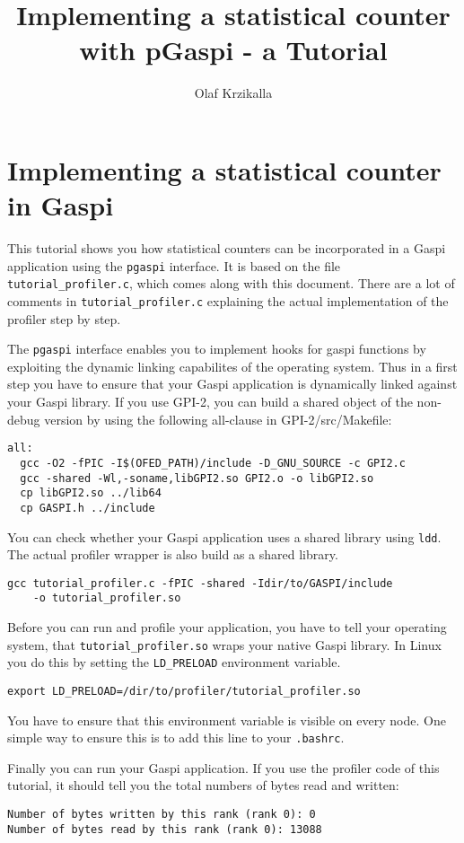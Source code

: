 \documentclass[plainarticle,german,final,hyperref,utf8]{article}
\author{Olaf Krzikalla}
\title{Implementing a statistical counter with pGaspi - a Tutorial}
\newcommand{\insertlisting}[2]{\lstset{
basicstyle=\ttfamily
, caption={#2}
, frame=single
, numbers=left
, numberstyle=\tiny
, stepnumber=1
, showstringspaces=true
, keepspaces=true
, columns=fullflexible
, classoffset=0
, morekeywords={gaspi_rank_t,gaspi_barrier,gaspi_timeout_t,gaspi_return_t,gaspi_config_t,gaspi_proc_init,gaspi_proc_term,gaspi_proc_kill
  ,gaspi_group_commit,gaspi_group_create,gaspi_group_add,gaspi_group_size,gaspi_group_ranks
  ,gaspi_segment_id_t,gaspi_segment_alloc,gaspi_segment_register,gaspi_segment_create
  ,gaspi_segment_ptr,gaspi_queue_id_t,gaspi_offset_t,gaspi_socket_id_t,gaspi_size_t,gaspi_pointer_t
  ,gaspi_write,gaspi_read,gaspi_wait
  ,gaspi_notify,gaspi_notify_reset,gaspi_notify_wait ,gaspi_atomic_value_t
  ,gaspi_proc_num,gaspi_proc_rank
  ,gaspi_number_t,gaspi_notification_t,gaspi_notification_id_t, gaspi_time_t
  ,gaspi_atomic_compare_swap,gaspi_atomic_set
  ,GASPI_SUCCESS,GASPI_TIMEOUT,GASPI_ERROR,GASPI_GROUP_ALL
  ,GASPI_BLOCK,GASPI_TEST,GASPI_CONFIGURATION_DEFAULT,GASPI_NORANK,GASPI_NOSTRING
  ,gaspi_notify_waitsome,gaspi_notify_size,gaspi_error_message
  ,gaspi_queue_size_max,gaspi_queue_size,gaspi_time_get
  ,gaspi_network_t, gaspi_number_t
  }
, commentstyle=\color{dkgreen}
, keywordstyle=\color{colorkeyword}
, classoffset=1
, morekeywords={ASSERT}
, keywordstyle=\color{colorassert}
, classoffset=0
}}
\newcommand{\GASPI}{{\sc Gaspi}}
\newcommand{\PGASPI}{{\tt pgaspi}}
\begin{document}
\section*{Implementing a statistical counter in \GASPI{}}

This tutorial shows you how statistical counters can be incorporated in a \GASPI{} application using the \PGASPI{} interface.
It is based on the file {\tt tutorial\_profiler.c}, which comes along with this document. 
There are a lot of comments in {\tt tutorial\_profiler.c} explaining the actual implementation of the profiler step by step.   
  
The \PGASPI{} interface enables you to implement hooks for gaspi functions by exploiting the dynamic linking capabilites of the operating system.
Thus in a first step you have to ensure that your \GASPI{} application is dynamically linked against your \GASPI{} library.
If you use GPI-2, you can build a shared object of the non-debug version by using the following all-clause in GPI-2/src/Makefile:   

\begin{lstlisting} 
all:
  gcc -O2 -fPIC -I$(OFED_PATH)/include -D_GNU_SOURCE -c GPI2.c
  gcc -shared -Wl,-soname,libGPI2.so GPI2.o -o libGPI2.so
  cp libGPI2.so ../lib64
  cp GASPI.h ../include
\end{lstlisting} 

You can check whether your \GASPI{} application uses a shared library using {\tt ldd}.
The actual profiler wrapper is also build as a shared library.

\begin{lstlisting} 
gcc tutorial_profiler.c -fPIC -shared -Idir/to/GASPI/include 
    -o tutorial_profiler.so  
\end{lstlisting} 

Before you can run and profile your application, you have to tell your operating system, that {\tt tutorial\_profiler.so} wraps your native \GASPI{} library. 
In Linux you do this by setting the {\tt LD\_PRELOAD} environment variable.
  
\begin{lstlisting} 
export LD_PRELOAD=/dir/to/profiler/tutorial_profiler.so
\end{lstlisting} 

You have to ensure that this environment variable is visible on every node. 
One simple way to ensure this is to add this line to your {\tt .bashrc}.

Finally you can run your \GASPI{} application. 
If you use the profiler code of this tutorial, it should tell you the total numbers of bytes read and written:

\begin{lstlisting} 
Number of bytes written by this rank (rank 0): 0
Number of bytes read by this rank (rank 0): 13088
\end{lstlisting} 

\end{document}

